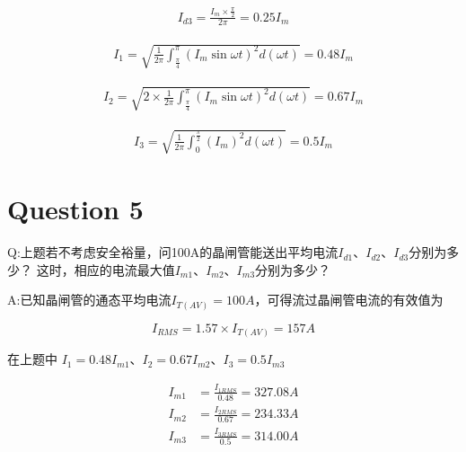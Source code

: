 \documentclass[a4paper]{article}
\begin{document}
\begin{equation}
    \begin{aligned}
        I_{d3} = \frac{I_m\times \frac{\pi}{2}}{2\pi} = 0.25I_m
    \end{aligned}
\end{equation}

\begin{equation}
    \begin{aligned}
        I_1 = \sqrt{\frac{1}{2\pi} \int_{\frac{\pi}{4}}^{\pi} (I_m\sin\omega t)^2 d(\omega t)} = 0.48I_m
    \end{aligned}
\end{equation}

\begin{equation}
    \begin{aligned}
        I_2 = \sqrt{2\times \frac{1}{2\pi} \int_{\frac{\pi}{4}}^{\pi} (I_m\sin\omega t)^2 d(\omega t)} = 0.67I_m
    \end{aligned}
\end{equation}

\begin{equation}
    \begin{aligned}
        I_3 = \sqrt{\frac{1}{2\pi} \int_{0}^{\frac{\pi}{2}} (I_m)^2 d(\omega t)} = 0.5I_m
    \end{aligned}
\end{equation}

\section{Question 5}

Q:上题若不考虑安全裕量，问100A的晶闸管能送出平均电流$I_{d1}$、$I_{d2}$、$I_{d3}$分别为多少？
这时，相应的电流最大值$I_{m1}$、$I_{m2}$、$I_{m3}$分别为多少？

A:已知晶闸管的通态平均电流$I_{T(AV)}=100A$，可得流过晶闸管电流的有效值为

\begin{equation}
    I_{RMS} = 1.57\times I_{T(AV)} = 157A
\end{equation}

在上题中 $I_1 = 0.48I_{m1}$、$I_2 = 0.67I_{m2}$、$I_3 = 0.5I_{m3}$

\begin{equation}
    \begin{aligned}
        I_{m1} & = \frac{I_{1RMS}}{0.48}=327.08A \\
        I_{m2} & = \frac{I_{2RMS}}{0.67}=234.33A \\
        I_{m3} & = \frac{I_{3RMS}}{0.5}=314.00A
    \end{aligned}
\end{equation}
\end{document}
